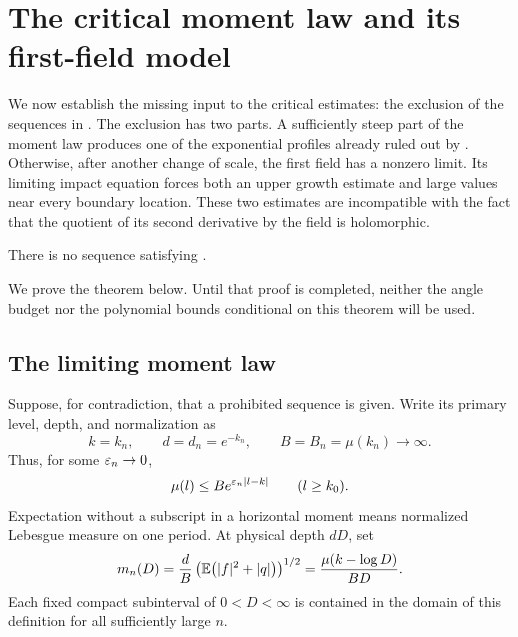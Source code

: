 \section{The critical moment law and its first-field model}
\label{sec:model}

We now establish the missing input to the critical estimates: the exclusion
of the sequences in .  The exclusion has two parts.
A sufficiently steep part of the moment law produces one of the exponential
profiles already ruled out by .  Otherwise,
after another change of scale, the first field has a nonzero limit.  Its
limiting impact equation forces both an upper growth estimate and large
values near every boundary location.  These two estimates are incompatible
with the fact that the quotient of its second derivative by the field is
holomorphic.

\begin{theorem}
\label{thm:sequence-exclusion}
There is no sequence satisfying .
\end{theorem}

We prove the theorem below.  Until that proof is completed, neither the
angle budget nor the polynomial bounds conditional on this theorem will
be used.

\subsection{The limiting moment law}
\label{model:moment-subsection}

Suppose, for contradiction, that a prohibited sequence is given.  Write its
primary level, depth, and normalization as
\[
 k=k_n,\qquad d=d_n=e^{-k_n},\qquad B=B_n=\mu(k_n)\longrightarrow\infty.
\]
Thus, for some \(\varepsilon_n\to0\),
\begin{equation}
\label{model:primary-normality}
 \mu(l)\le B e^{\varepsilon_n|l-k|}
 \qquad(l\ge k_0).
\end{equation}
Expectation without a subscript in a horizontal moment means normalized
Lebesgue measure on one period.  At physical depth \(dD\), set
\begin{equation}
\label{model:primary-moment}
 m_n(D)=\frac dB
 \left(\mathbb E\bigl(|f|^2+|q|\bigr)\right)^{1/2}
 =\frac{\mu(k-\log D)}{BD}.
\end{equation}
Each fixed compact subinterval of \(0<D<\infty\) is contained in the
domain of this definition for all sufficiently large \(n\).

